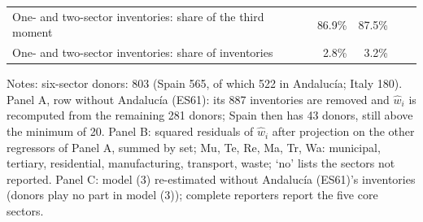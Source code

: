 \begin{table}[width=\linewidth,pos=htbp]
\begin{tabular*}{\tblwidth}{@{}LRRRR@{}}
One- and two-sector inventories: share of the third moment & 86.9\% & 87.5\% & & \\
One- and two-sector inventories: share of inventories & 2.8\% & 3.2\% & & \\
\bottomrule
\end{tabular*}
\par\smallskip\begin{minipage}{\linewidth}\footnotesize Notes: six-sector donors: 803 (Spain 565, of which 522 in Andaluc\'ia; Italy 180). Panel A, row without Andaluc\'ia (ES61): its 887 inventories are removed and $\hat w_i$ is recomputed from the remaining 281 donors; Spain then has 43 donors, still above the minimum of 20. Panel B: squared residuals of $\hat w_i$ after projection on the other regressors of Panel A, summed by set; Mu, Te, Re, Ma, Tr, Wa: municipal, tertiary, residential, manufacturing, transport, waste; `no' lists the sectors not reported. Panel C: model (3) re-estimated without Andaluc\'ia (ES61)'s inventories (donors play no part in model (3)); complete reporters report the five core sectors.\end{minipage}
\end{table}
